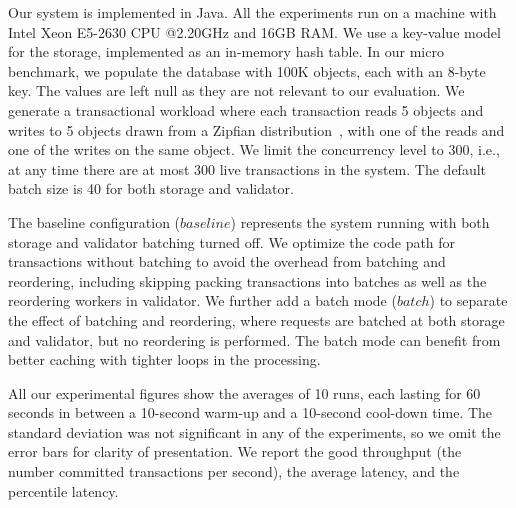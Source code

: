 Our system is implemented in Java. All the experiments run on a machine with
Intel Xeon E5-2630 CPU @2.20GHz and 16GB RAM. We use a key-value model for the
storage, implemented as an in-memory hash table. In our micro benchmark, we populate the database with 100K objects, each with an 8-byte key. The values are left null as they are not relevant to our evaluation. We generate a transactional workload where each transaction reads 5 objects and writes to 5 objects drawn from a Zipfian distribution~\cite{gray1994quickly}, with one of the reads and one of the writes on the same object. We limit the concurrency level to 300, i.e., at any time there are at most 300 live transactions in the system. The default batch size is 40 for both storage and validator.

The baseline configuration ($baseline$) represents the system running with both storage and validator batching turned off. We optimize the code path for transactions without batching to avoid the overhead from batching and reordering, including skipping packing transactions into batches as well as the reordering workers in validator. We further add a batch mode ($batch$) to separate the effect of batching and reordering, where requests are batched at both storage and validator, but no reordering is performed. The batch mode can benefit from better caching with tighter loops in the processing. 



All our experimental figures show the averages of 10 runs, each lasting for 60 seconds in between a 10-second warm-up and a 10-second cool-down time. The standard deviation was not significant in any of the experiments, so we omit the error bars for clarity of presentation. We report the good throughput (the number committed transactions per second), the average latency, and the percentile latency.


